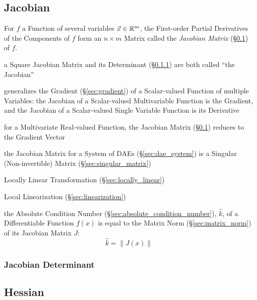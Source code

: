 \subsection{Jacobian}\label{sec:jacobian}

For $f$ a Function of several variables $\vec{x} \in \mathbb{R}^m$, the First-order
Partial Derivatives of the Components of $f$ form an $n \times m$ Matrix called
the \emph{Jacobian Matrix} (\S\ref{sec:jacobian}) of $f$.

a Square Jacobian Matrix and its Determinant (\S\ref{sec:jacobian_determinant})
are both called ``the Jacobian''

generalizes the Gradient (\S\ref{sec:gradient}) of a Scalar-valued Function of
multiple Variables: the Jacobian of a Scalar-valued Multivariable Function is
the Gradient, and the Jacobian of a Scalar-valued Single Variable Function is
its Derivative

for a Multivariate Real-valued Function, the Jacobian Matrix
(\S\ref{sec:jacobian}) reduces to the Gradient Vector

\fist the Jacobian Matrix for a System of DAEs (\S\ref{sec:dae_system}) is
a Singular (Non-invertible) Matrix (\S\ref{sec:singular_matrix})

\fist Locally Linear Transformation (\S\ref{sec:locally_linear})

\fist Local Linearization (\S\ref{sec:linearization})

the Absolute Condition Number (\S\ref{sec:absolute_condition_number}),
$\hat{k}$, of a Differentiable Function $f(x)$ is equal to the Matrix Norm
(\S\ref{sec:matrix_norm}) of its Jacobian Matrix $J$:
\[
  \hat{k} = \|J(x)\|
\]



\subsubsection{Jacobian Determinant}\label{sec:jacobian_determinant}



\subsection{Hessian}\label{sec:hessian}

